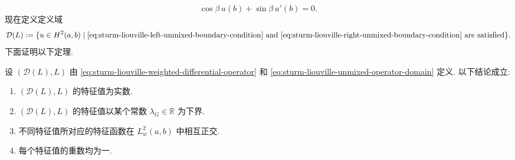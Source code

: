 \begin{equation}\label{eq:sturm-liouville-right-unmixed-boundary-condition}
\cos\beta\,u(b)+\sin\beta\,u'(b)=0.
\end{equation}
现在定义定义域
\begin{equation}\label{eq:sturm-liouville-unmixed-operator-domain}
\mathcal{D}(L):=\{u\in H^2(a,b)\mid\eqref{eq:sturm-liouville-left-unmixed-boundary-condition}\text{ and }\eqref{eq:sturm-liouville-right-unmixed-boundary-condition}\text{ are satisfied}\}.
\end{equation}
下面证明以下定理.

\begin{Theorem}
\label{thm:regular-sturm-liouville-first-spectral-properties}
设 $(\mathcal{D}(L),L)$ 由 \eqref{eq:sturm-liouville-weighted-differential-operator} 和 \eqref{eq:sturm-liouville-unmixed-operator-domain} 定义. 以下结论成立:\begin{enumerate}\item $(\mathcal{D}(L),L)$ 的特征值为实数.\item $(\mathcal{D}(L),L)$ 的特征值以某个常数 $\lambda_G\in\mathbb{R}$ 为下界.\item 不同特征值所对应的特征函数在 $L_w^2(a,b)$ 中相互正交.\item 每个特征值的重数均为一.\end{enumerate}
\end{Theorem}

